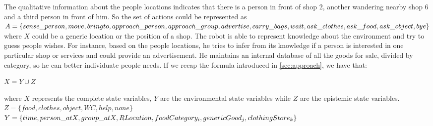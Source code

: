 \documentclass[pdftex,12pt,a4paper]{report}
\begin{document}
\noindent The qualitative information about the people locations indicates that there is a person in front of shop 2, another wandering nearby shop 6 and a third person in front of him. 
\noindent So the set of actions could be represented as \\ 

$A = \{sense\_person, move, bringto, approach\_person, approach\_group, advertise, \\ 
       carry\_bags, wait, ask\_clothes, ask\_food, ask\_object, bye\}$\\ 

\noindent where $X$ could be a generic location or the position of a shop.
\noindent The robot is able to represent knowledge about the environment and try to guess people wishes.
For instance, based on the people locations, he tries to infer from its knowledge if a person is interested in one particular shop or services and could provide an advertisement. 
He maintains an internal database of all the goods for sale, divided by category, so he can better individuate people needs.
If we recap the formula introduced in \ref{sec:approach}, we have that: \\

\centerline{$X = Y \cup Z$}

\noindent where $X$ represents the complete state variables, $Y$ are the environmental state variables while $Z$ are the epistemic state variables. \\

\noindent $Z = \{food, clothes, object, WC, help, none\}$\\
\noindent $Y = \{time, person\_atX, group\_atX, RLocation, foodCategory_i, genericGood_j, \\ clothingStore_k \}$\\
\end{document}
